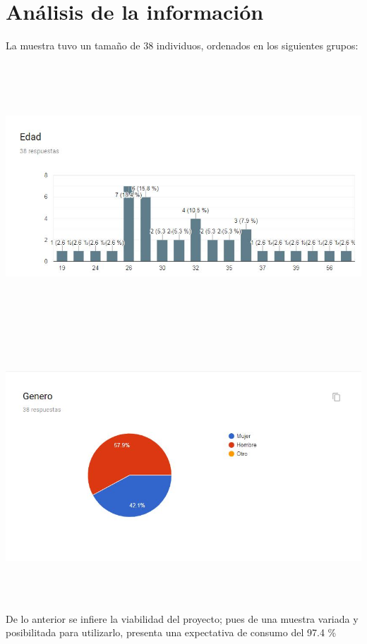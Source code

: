 \section{Análisis de la información}

La muestra tuvo un tamaño de 38 individuos, ordenados en los siguientes grupos:\\
\begin{center}
\includegraphics[width=16cm, height=10cm,keepaspectratio=true]{Desarrollo/RecoleccionInformacion/imgs/edad.JPG}
\includegraphics[width=16cm, height=10cm,keepaspectratio=true]{Desarrollo/RecoleccionInformacion/imgs/genero.JPG}
\end{center}
De lo anterior se infiere la viabilidad del proyecto; pues de una muestra variada y posibilitada para utilizarlo, presenta una expectativa de consumo del 97.4 \% \\
